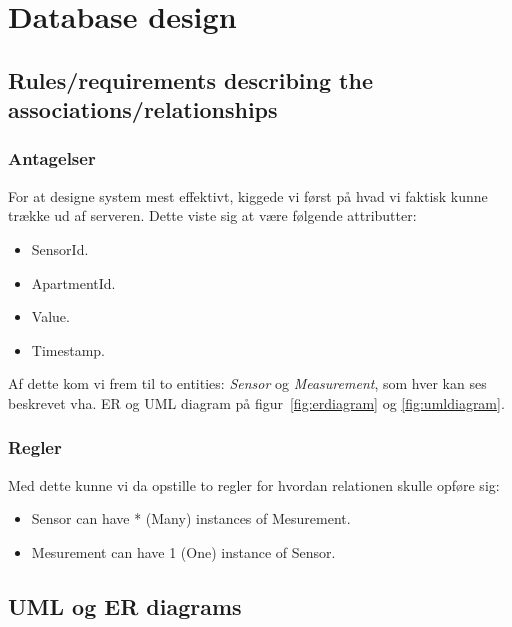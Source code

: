 \section{Database design}

\subsection{Rules/requirements describing the associations/relationships}

\subsubsection{Antagelser}


For at designe system mest effektivt, kiggede vi først på hvad vi faktisk kunne trække ud af serveren. Dette viste sig at være følgende attributter:

\begin{itemize}
	\item SensorId.
	\item ApartmentId.
	\item Value.
	\item Timestamp.
\end{itemize}

Af dette kom vi frem til to entities: \textit{Sensor} og \textit{Measurement}, som hver kan ses beskrevet vha. ER og UML diagram på figur~\ref{fig:erdiagram} og \ref{fig:umldiagram}.

\subsubsection{Regler}

Med dette kunne vi da opstille to regler for hvordan relationen skulle opføre sig:

\begin{itemize}
	\item Sensor can have * (Many) instances of Mesurement.
	\item Mesurement can have 1 (One) instance of Sensor.
\end{itemize}

\subsection{UML og ER diagrams}

